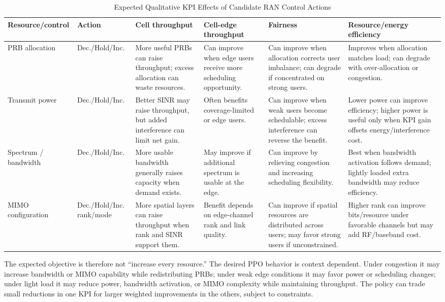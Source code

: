 \documentclass[conference]{IEEEtran}
\begin{document}
\begin{table}[t]
\caption{Expected Qualitative KPI Effects of Candidate RAN Control Actions}
\centering
\scriptsize
\setlength{\tabcolsep}{3.5pt}
\renewcommand{\arraystretch}{1.15}
\begin{tabular}{p{2.0cm}p{1.55cm}p{2.55cm}p{2.55cm}p{2.45cm}p{3.0cm}}
\toprule
Resource/control & Action & Cell throughput & Cell-edge throughput & Fairness & Resource/energy efficiency\\
\midrule
PRB allocation &
Dec./Hold/Inc. &
More useful PRBs can raise throughput; excess allocation can waste resources. &
Can improve when edge users receive more scheduling opportunity. &
Can improve when allocation corrects user imbalance; can degrade if concentrated on strong users. &
Improves when allocation matches load; can degrade with over-allocation or congestion.\\
\addlinespace
Transmit power &
Dec./Hold/Inc. &
Better SINR may raise throughput, but added interference can limit net gain. &
Often benefits coverage-limited or edge users. &
Can improve when weak users become schedulable; excess interference can reverse the benefit. &
Lower power can improve efficiency; higher power is useful only when KPI gain offsets energy/interference cost.\\
\addlinespace
Spectrum / bandwidth &
Dec./Hold/Inc. &
More usable bandwidth generally raises capacity when demand exists. &
May improve if additional spectrum is usable at the edge. &
Can improve by relieving congestion and increasing scheduling flexibility. &
Best when bandwidth activation follows demand; lightly loaded extra bandwidth may reduce efficiency.\\
\addlinespace
MIMO configuration &
Dec./Hold/Inc. rank/mode &
More spatial layers can raise throughput when rank and SINR support them. &
Benefit depends on edge-channel rank and link quality. &
Can improve if spatial resources are distributed across users; may favor strong users if unconstrained. &
Higher rank can improve bits/resource under favorable channels but may add RF/baseband cost.\\
\bottomrule
\end{tabular}
\end{table}

The expected objective is therefore not ``increase every resource.'' The desired PPO behavior is context dependent. Under congestion it may increase bandwidth or MIMO capability while redistributing PRBs; under weak edge conditions it may favor power or scheduling changes; under light load it may reduce power, bandwidth activation, or MIMO complexity while maintaining throughput. The policy can trade small reductions in one KPI for larger weighted improvements in the others, subject to constraints.
\end{document}
